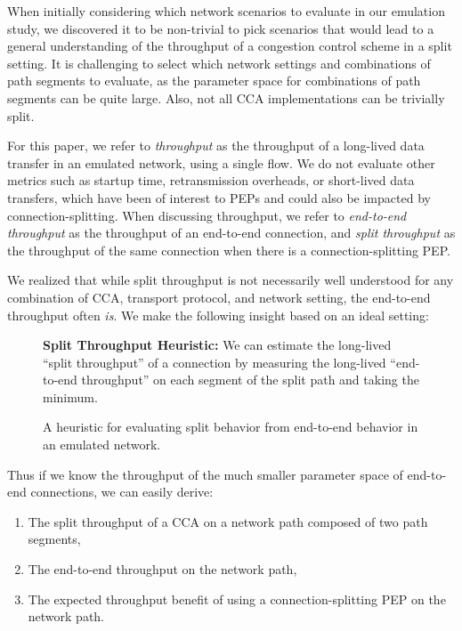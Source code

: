 When initially considering which network scenarios to evaluate in our emulation
study, we discovered it to be non-trivial to pick scenarios that would lead to
a general understanding of the throughput of a congestion control scheme in a
split setting. It is challenging to select which network settings and
combinations of path segments to evaluate, as the parameter space for
combinations of path segments can be quite large. Also, not all CCA
implementations can be trivially split.

For this paper, we refer to \textit{throughput} as the throughput of a
long-lived data transfer in an emulated network, using a single flow.
We do not evaluate other metrics such as startup time, retransmission
overheads, or short-lived data transfers, which have been of interest to
PEPs and could also be impacted by connection-splitting.
When discussing throughput, we refer to \textit{end-to-end throughput} as
the throughput of an end-to-end connection, and \textit{split throughput} as the
throughput of the same connection when there is a connection-splitting PEP.

We realized that while split throughput is not necessarily well
understood for any combination of CCA, transport protocol, and network setting,
the end-to-end throughput often \textit{is}. We make the following insight
based on an ideal setting:

\begin{figure}[h]
  \centering
  \begin{tcolorbox}[colback=yellow!20, width=\linewidth, sharp corners]
    \textbf{Split Throughput Heuristic:} We can estimate the long-lived ``split
     throughput'' of a connection by measuring the long-lived ``end-to-end
     throughput'' on each segment of the split path and taking the minimum.
  \end{tcolorbox}
  \caption{A heuristic for evaluating split behavior from end-to-end behavior in
   an emulated network.}
  \label{fig:heuristic}
\end{figure}

\noindent Thus if we know the throughput of the much smaller parameter
 space of end-to-end connections, we can easily derive:

\begin{enumerate}[noitemsep]
    \item The split throughput of a CCA on a network path composed of two path
     segments,
    \item The end-to-end throughput on the network path,
    \item The expected throughput benefit of using a connection-splitting PEP
     on the network path.
\end{enumerate}

